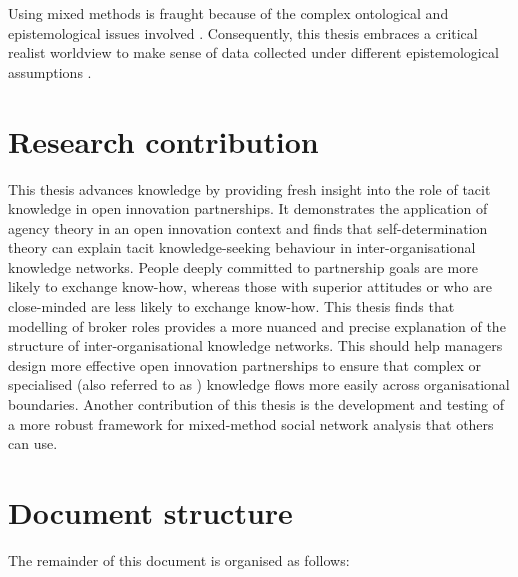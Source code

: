 Using mixed methods is fraught because of the complex ontological and epistemological issues involved \citep{giddings2006mixed,mcevoy2006critical}. Consequently, this thesis embraces a critical realist worldview to make sense of data collected under different epistemological assumptions \citep{johnson2004mixed,giddings2006mixed,welch2011theorising}. \medskip

\section{Research contribution}

This thesis advances knowledge by providing fresh insight into the role of tacit knowledge in open innovation partnerships. It demonstrates the application of agency theory in an open innovation context and finds that self-determination theory can explain tacit knowledge-seeking behaviour in inter-organisational knowledge networks. People deeply committed to partnership goals are more likely to exchange know-how, whereas those with superior attitudes or who are close-minded are less likely to exchange know-how. This thesis finds that modelling of broker roles provides a more nuanced and precise explanation of the structure of inter-organisational knowledge networks. This should help managers design more effective open innovation partnerships to ensure that complex or specialised (also referred to as ) knowledge flows more easily across organisational boundaries. Another contribution of this thesis is the development and testing of a more robust framework for mixed-method social network analysis that others can use. 

\section{Document structure}

The remainder of this document is organised as follows:

